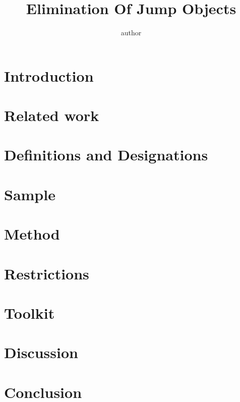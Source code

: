 \documentclass[sigplan,review,11pt,nonacm,natbib=false]{acmart}
\title{Elimination Of Jump Objects}
\author{author}
\theoremstyle{theorems}
\begin{document}
\maketitle

\section{Introduction}
\label{sec:intro}


\section{Related work}
\label{sec:related}


\section{Definitions and Designations}
\label{sec:defs}


\section{Sample}
\label{sec:sample}


\section{Method}
\label{sec:method}


\section{Restrictions}
\label{sec:rest}


\section{Toolkit}
\label{sec:tool}


\section{Discussion}
\label{sec:discus}


\section{Conclusion}
\label{sec:conclusion}


\printbibliography

\clearpage
\end{document}
